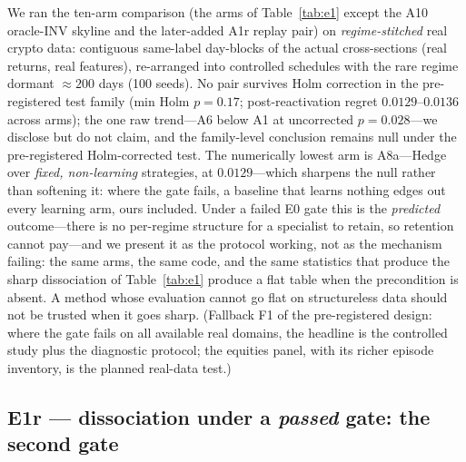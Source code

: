 \documentclass{article}
\begin{document}
We ran the ten-arm comparison (the arms of Table~\ref{tab:e1} except the
A10 oracle-INV skyline and the later-added A1r replay pair) on
\emph{regime-stitched} real crypto data:
contiguous same-label day-blocks of the actual cross-sections
(real returns, real features), re-arranged into controlled schedules with
the rare regime dormant $\approx 200$ days (100 seeds). No pair survives
Holm correction in the pre-registered test family (min Holm $p = 0.17$;
post-reactivation regret $0.0129$--$0.0136$ across arms); the one raw
trend---A6 below A1 at uncorrected $p = 0.028$---we disclose but do not
claim, and the family-level conclusion remains null under the
pre-registered Holm-corrected test. The numerically lowest arm is
A8a---Hedge
over \emph{fixed, non-learning} strategies, at $0.0129$---which
sharpens the null rather than softening it: where the gate fails, a
baseline that learns nothing edges out every learning arm, ours
included. Under a failed E0 gate
this is the \emph{predicted} outcome---there is no per-regime structure
for a specialist to retain, so retention cannot pay---and we present it as
the protocol working, not as the mechanism failing: the same arms, the
same code, and the same statistics that produce the sharp dissociation of
Table~\ref{tab:e1} produce a flat table when the precondition is absent.
A method whose evaluation cannot go flat on structureless data should not
be trusted when it goes sharp. (Fallback F1 of the pre-registered design:
where the gate fails on all available real domains, the headline is the
controlled study plus the diagnostic protocol; the equities panel, with
its richer episode inventory, is the planned real-data test.)

\subsection{E1r --- dissociation under a \emph{passed} gate: the second
gate}
\label{sec:e1r}
\end{document}
